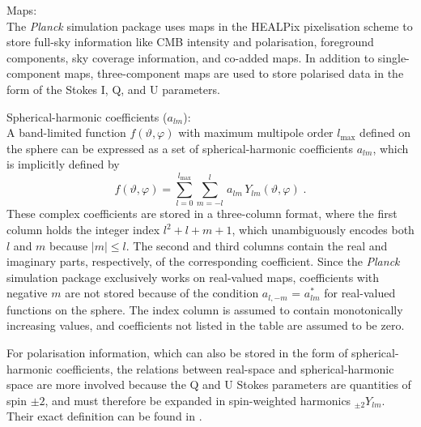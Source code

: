 \documentclass{aa}
\begin{document}
\begin{description}
  \item {Maps:}\\ The \emph{Planck} simulation package uses maps in
    the HEALPix pixelisation scheme to store full-sky information like
    CMB intensity and polarisation, foreground components, sky
    coverage information, and co-added maps. In addition to
    single-component maps, three-component maps are used to store
    polarised data in the form of the Stokes I, Q, and U parameters.\\

  \item {Spherical-harmonic coefficients ($a_{lm}$):}\\ A band-limited
    function $f(\vartheta,\varphi)$ with maximum multipole order
    $l_\text{max}$ defined on the sphere can be expressed as a set of
    spherical-harmonic coefficients $a_{lm}$, which is implicitly
    defined by
    \begin{equation}
      f(\vartheta,\varphi)=
      \sum_{l=0}^{l_{\text{max}}}\sum_{m=-l}^l\,
      a_{lm}\,Y_{lm}(\vartheta,\varphi)\;.
    \end{equation}
    These complex coefficients are stored in a three-column format,
    where the first column holds the integer index $l^2+l+m+1$, which
    unambiguously encodes both $l$ and $m$ because $|m|\leq l$. The
    second and third columns contain the real and imaginary parts,
    respectively, of the corresponding coefficient. Since the
    \emph{Planck} simulation package exclusively works on real-valued
    maps, coefficients with negative $m$ are not stored
    because of the condition $a_{l,-m}$ = $a_{lm}^*$ for real-valued
    functions on the sphere. The index column is assumed to contain
    monotonically increasing values, and coefficients not listed in
    the table are assumed to be zero.

    For polarisation information, which can also be stored in the form of
    spherical-harmonic coefficients, the relations between real-space
    and spherical-harmonic space are more involved because the Q and U
    Stokes parameters are quantities of spin $\pm2$, and must
    therefore be expanded in spin-weighted harmonics $_{\pm 2}Y_{lm}$.
    Their exact definition can be found in
    \cite{zaldarriaga-seljak-1997}.\\


\end{description}
\end{document}
